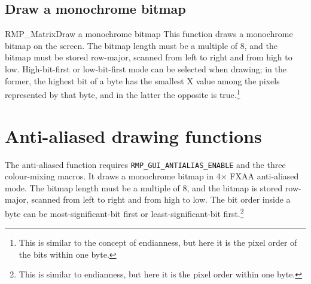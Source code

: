 \subsection{Draw a monochrome bitmap}
\begin{apidesc}{RMP\_Matrix}{Draw a monochrome bitmap}\label{api:RMP_Matrix}
    This function draws a monochrome bitmap on the screen.
    The bitmap length must be a multiple of 8, and the bitmap must be stored row-major, scanned from left to right and from high to low.
    High-bit-first or low-bit-first mode can be selected when drawing; in the former, the highest bit of a byte has the smallest X value among the pixels represented by that byte, and in the latter the opposite is true.\footnote{This is similar to the concept of endianness, but here it is the pixel order of the bits within one byte.}
    \begin{apiparams}
    \end{apiparams}
    \begin{apiret}
    \end{apiret}
\end{apidesc}

\section{Anti-aliased drawing functions}

The anti-aliased function requires \texttt{RMP\_GUI\_ANTIALIAS\_ENABLE} and the three colour-mixing macros.
It draws a monochrome bitmap in 4$\times$ FXAA anti-aliased mode.
The bitmap length must be a multiple of 8, and the bitmap is stored row-major, scanned from left to right and from high to low.
The bit order inside a byte can be most-significant-bit first or least-significant-bit first.\footnote{This is similar to endianness, but here it is the pixel order within one byte.}

